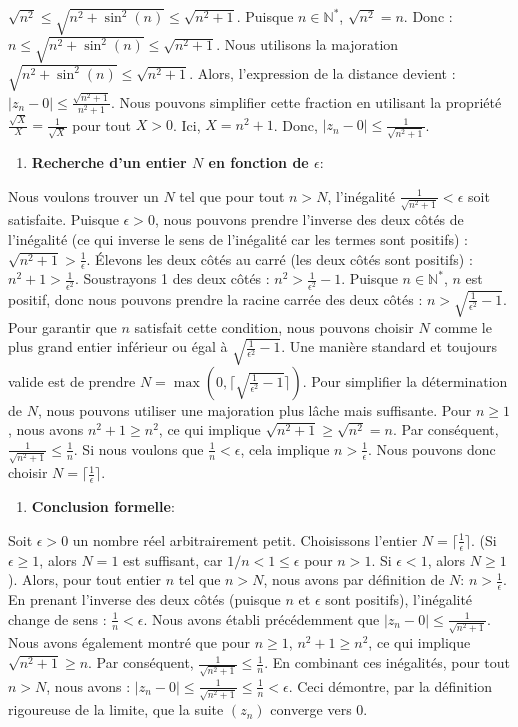 \documentclass[a4paper,11pt]{report}
\begin{document}
    $\sqrt{n^2} \le \sqrt{n^2 + \sin^2(n)} \le \sqrt{n^2+1}$.
    Puisque $n \in \mathbb{N}^*$, $\sqrt{n^2} = n$. Donc :
    $n \le \sqrt{n^2 + \sin^2(n)} \le \sqrt{n^2+1}$.
    Nous utilisons la majoration $\sqrt{n^2 + \sin^2(n)} \le \sqrt{n^2+1}$.
    Alors, l'expression de la distance devient :
    $|z_n - 0| \le \frac{\sqrt{n^2+1}}{n^2+1}$.
    Nous pouvons simplifier cette fraction en utilisant la propriété $\frac{\sqrt{X}}{X} = \frac{1}{\sqrt{X}}$ pour tout $X > 0$. Ici, $X=n^2+1$.
    Donc, $|z_n - 0| \le \frac{1}{\sqrt{n^2+1}}$.
\begin{enumerate}
\item \textbf{Recherche d'un entier $N$ en fonction de $\epsilon$}:
\end{enumerate}
    Nous voulons trouver un $N$ tel que pour tout $n > N$, l'inégalité $\frac{1}{\sqrt{n^2+1}} < \epsilon$ soit satisfaite.
    Puisque $\epsilon > 0$, nous pouvons prendre l'inverse des deux côtés de l'inégalité (ce qui inverse le sens de l'inégalité car les termes sont positifs) :
    $\sqrt{n^2+1} > \frac{1}{\epsilon}$.
    Élevons les deux côtés au carré (les deux côtés sont positifs) :
    $n^2+1 > \frac{1}{\epsilon^2}$.
    Soustrayons 1 des deux côtés :
    $n^2 > \frac{1}{\epsilon^2} - 1$.
    Puisque $n \in \mathbb{N}^*$, $n$ est positif, donc nous pouvons prendre la racine carrée des deux côtés :
    $n > \sqrt{\frac{1}{\epsilon^2} - 1}$.
    Pour garantir que $n$ satisfait cette condition, nous pouvons choisir $N$ comme le plus grand entier inférieur ou égal à $\sqrt{\frac{1}{\epsilon^2} - 1}$. Une manière standard et toujours valide est de prendre $N = \max(0, \lceil \sqrt{\frac{1}{\epsilon^2} - 1} \rceil)$.
    Pour simplifier la détermination de $N$, nous pouvons utiliser une majoration plus lâche mais suffisante. Pour $n \ge 1$, nous avons $n^2+1 \ge n^2$, ce qui implique $\sqrt{n^2+1} \ge \sqrt{n^2} = n$.
    Par conséquent, $\frac{1}{\sqrt{n^2+1}} \le \frac{1}{n}$.
    Si nous voulons que $\frac{1}{n} < \epsilon$, cela implique $n > \frac{1}{\epsilon}$.
    Nous pouvons donc choisir $N = \lceil \frac{1}{\epsilon} \rceil$.
\begin{enumerate}
\item \textbf{Conclusion formelle}:
\end{enumerate}
    Soit $\epsilon > 0$ un nombre réel arbitrairement petit.
    Choisissons l'entier $N = \lceil \frac{1}{\epsilon} \rceil$. (Si $\epsilon \ge 1$, alors $N=1$ est suffisant, car $1/n < 1 \le \epsilon$ pour $n>1$. Si $\epsilon < 1$, alors $N \ge 1$).
    Alors, pour tout entier $n$ tel que $n > N$, nous avons par définition de $N$:
    $n > \frac{1}{\epsilon}$.
    En prenant l'inverse des deux côtés (puisque $n$ et $\epsilon$ sont positifs), l'inégalité change de sens :
    $\frac{1}{n} < \epsilon$.
    Nous avons établi précédemment que $|z_n - 0| \le \frac{1}{\sqrt{n^2+1}}$.
    Nous avons également montré que pour $n \ge 1$, $n^2+1 \ge n^2$, ce qui implique $\sqrt{n^2+1} \ge n$.
    Par conséquent, $\frac{1}{\sqrt{n^2+1}} \le \frac{1}{n}$.
    En combinant ces inégalités, pour tout $n > N$, nous avons :
    $|z_n - 0| \le \frac{1}{\sqrt{n^2+1}} \le \frac{1}{n} < \epsilon$.
    Ceci démontre, par la définition rigoureuse de la limite, que la suite $(z_n)$ converge vers 0.
\end{document}
